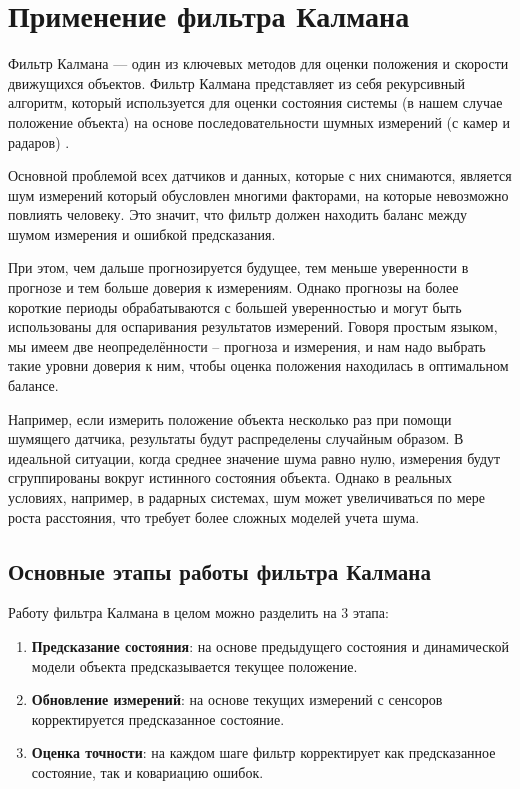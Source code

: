 \chapter{Применение фильтра Калмана}

Фильтр Калмана — один из ключевых методов для оценки положения и скорости движущихся 
объектов. Фильтр Калмана представляет из себя рекурсивный алгоритм, который используется 
для оценки состояния системы (в нашем случае положение объекта) на основе 
последовательности шумных измерений (с камер и радаров) \cite{KF}.

Основной проблемой всех датчиков и данных, которые с них снимаются, является шум измерений
который обусловлен многими факторами, на которые невозможно повлиять человеку. Это значит, 
что фильтр должен находить баланс между шумом измерения и ошибкой предсказания.

При этом, чем дальше прогнозируется будущее, тем меньше уверенности в прогнозе и тем больше
доверия к измерениям. Однако прогнозы на более короткие периоды обрабатываются с большей
уверенностью и могут быть использованы для оспаривания результатов измерений.
Говоря простым языком, мы имеем две неопределённости – прогноза и измерения, и нам надо
выбрать такие уровни доверия к ним, чтобы оценка положения находилась в оптимальном балансе. 

Например, если измерить положение объекта несколько раз при помощи шумящего датчика,
результаты будут распределены случайным образом. В идеальной ситуации, когда среднее 
значение шума равно нулю, измерения будут сгруппированы вокруг истинного состояния 
объекта. Однако в реальных условиях, например, в радарных системах, шум может увеличиваться
по мере роста расстояния, что требует более сложных моделей учета шума.

\section{Основные этапы работы фильтра Калмана}

Работу фильтра Калмана в целом можно разделить на 3 этапа:

\begin{enumerate}

    \item \textbf{Предсказание состояния}: на основе предыдущего состояния и динамической модели объекта предсказывается текущее положение.
	
    \item \textbf{Обновление измерений}: на основе текущих измерений с сенсоров корректируется предсказанное состояние.
	
    \item \textbf{Оценка точности}: на каждом шаге фильтр корректирует как предсказанное состояние, так и ковариацию ошибок.
	
\end{enumerate}

